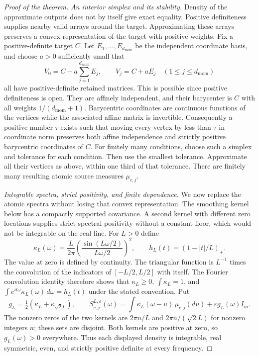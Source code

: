 \begin{proof}[Proof of the theorem]
\emph{An interior simplex and its stability.}
Density of the approximate outputs does not by itself give exact equality. Positive definiteness supplies nearby valid arrays around the target. Approximating these arrays preserves a convex representation of the target with positive weights.
Fix a positive-definite target $C$. Let $E_1,\ldots,E_{d_{\mathrm{mom}}}$ be the
independent coordinate basis, and choose $a>0$ sufficiently small that
\[
 V_0=C-a\sum_{j=1}^{d_{\mathrm{mom}}} E_j,\qquad V_j=C+aE_j\quad(1\le j\le d_{\mathrm{mom}})
\]
all have positive-definite retained matrices. This is possible since
positive definiteness is open. They are affinely independent, and their
barycenter is $C$ with all weights $1/(d_{\mathrm{mom}}+1)$. Barycentric coordinates
are continuous functions of the vertices while the associated affine
matrix is invertible. Consequently a positive number $\tau$ exists
such that moving every vertex by less than $\tau$ in coordinate norm
preserves both affine independence and strictly positive barycentric
coordinates of $C$. For finitely many conditions, choose such a simplex
and tolerance for each condition. Then use the smallest tolerance. Approximate
all their vertices as above, within one third of that tolerance.
There are finitely many resulting atomic source measures $\mu_{c,j}$.

\emph{Integrable spectra, strict positivity, and finite dependence.}
We now replace the atomic spectra without losing that convex representation. The smoothing kernel below has a compactly supported covariance. A second kernel with different zero locations supplies strict spectral positivity without a constant floor, which would not be integrable on the real line.
For $L>0$ define
\[
 \kappa_L(\omega)=\frac{L}{2\pi}
 \left(\frac{\sin(L\omega/2)}{L\omega/2}\right)^2,
 \qquad h_L(t)=(1-|t|/L)_+.
\]
The value at zero is defined by continuity. The triangular function is
$L^{-1}$ times the convolution of the indicators of
$[-L/2,L/2]$ with itself. The Fourier convolution identity therefore
shows that $\kappa_L\ge0$, $\int\kappa_L=1$, and
$\int e^{it\omega}\kappa_L(\omega)\,d\omega=h_L(t)$ under the
stated convention. Put
\[
 g_L=\tfrac12(\kappa_L+\kappa_{\sqrt2L}),\qquad
 S_{c,j}^{L,\varepsilon}(\omega)
 =\int\kappa_L(\omega-u)\,\mu_{c,j}(du)
       +\varepsilon g_L(\omega)I_m.
\]
The nonzero zeros of the two kernels are $2\pi n/L$ and
$2\pi n/(\sqrt2 L)$ for nonzero integers $n$; these sets are disjoint.
Both kernels are positive at zero, so $g_L(\omega)>0$ everywhere.
Thus each displayed density is integrable, real symmetric, even,
and strictly positive definite at every frequency.


\end{proof}
